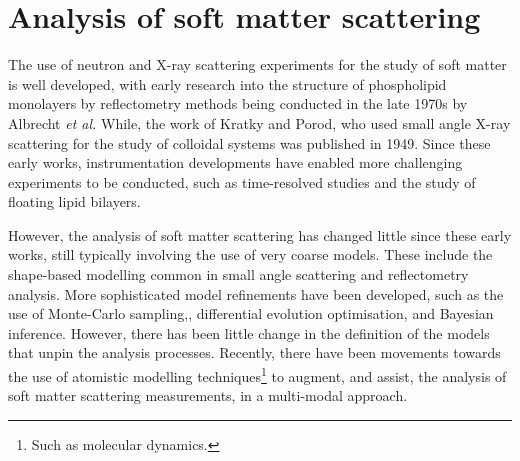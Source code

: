 \section{Analysis of soft matter scattering}
The use of neutron and X-ray scattering experiments for the study of soft matter is well developed, with early research into the structure of phospholipid monolayers by reflectometry methods being conducted in the late 1970s by Albrecht \emph{et al.}\autocite{albrecht_polymorphism_1978}
While, the work of Kratky and Porod,\autocite{kratky_diffuse_1949} who used small angle X-ray scattering for the study of colloidal systems was published in 1949.
Since these early works, instrumentation developments have enabled more challenging experiments to be conducted, such as time-resolved studies \autocite{jensen_monitoring_2014} and the study of floating lipid bilayers.\autocite{rondelli_reflectivity_2012}

However, the analysis of soft matter scattering has changed little since these early works, still typically involving the use of very coarse models.
These include the shape-based modelling common in small angle scattering \autocite[][see Section~\ref{sec:sasanal}]{hassan_small_2003} and reflectometry analysis.\autocite[][see Section~\ref{sec:sasanal}]{campbell_structure_2018,lu_analysis_1996}
More sophisticated model refinements have been developed, such as the use of Monte-Carlo sampling,\autocite{pedersen_monte_2002}, differential evolution optimisation,\autocite{wormington_characterization_1999} and Bayesian inference.\autocite{nelson_refnx_2019}
However, there has been little change in the definition of the models that unpin the analysis processes.
Recently, there have been movements towards the use of atomistic modelling techniques\footnote{Such as molecular dynamics.} to augment, and assist, the analysis of soft matter scattering measurements, in a multi-modal approach.\autocite{scoppola_combining_2018}


